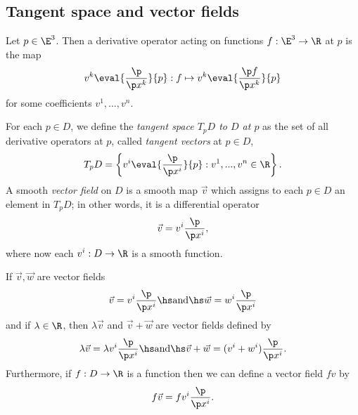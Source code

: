 \documentclass{article}
\begin{document}
\subsection{Tangent space and vector fields}

\begin{definition}
    Let $p\in\E^3$. Then a derivative operator acting on functions $f:\E^3\to\R$
    at $p$ is the map
    \begin{align*}
        v^k \eval{\frac{\p }{\p x^k}}{p} :
        f \mapsto v^k \eval{\frac{\p f}{\p x^k}}{p}
    \end{align*}
    for some coefficients $v^1,...,v^n$.
\end{definition}

\begin{definition}
    For each $p\in D$, we define the \emph{tangent space $T_pD$ to $D$ at $p$} as the
    set of all derivative operators at $p$, called \emph{tangent vectors} at $p\in D$,
    \begin{align*}
        T_p D =\left\lbrace v^i \eval{\frac{\p}{\p x^i}}{p}: v^1,...,v^n\in\R\right\rbrace.
    \end{align*}
    A smooth \emph{vector field} on $D$ is a smooth map $\vec v$ which assigns to each
    $p\in D$ an element in $T_pD$; in other words,
    it is a differential operator
    \begin{align*}
        \vec v = v^i\frac{\p}{\p x^i},
    \end{align*}
    where now each $v^i:D\to\R$ is a smooth function.
\end{definition}

\begin{definition}
    If $\vec v,\vec w$ are vector fields
    \begin{align*}
        \vec v = v^i \frac{\p}{\p x^i}\hs\text{and}\hs \vec w = w^i \frac{\p }{\p x^i}
    \end{align*}
    and if $\lambda\in\R$, then $\lambda \vec v$ and $\vec v+\vec w$ are vector fields defined by
    \begin{align*}
        \lambda \vec v = \lambda v^i \frac{\p }{\p x^i}\hs\text{and}\hs
        \vec v+\vec w = (v^i+w^i)\frac{\p }{\p x^i}.
    \end{align*}
    Furthermore, if $f:D\to\R$ is a function then we can define a vector field
    $fv$ by
    \begin{align*}
        f\vec v = fv^i\frac{\p }{\p x^i}.
    \end{align*}
\end{definition}
\end{document}
